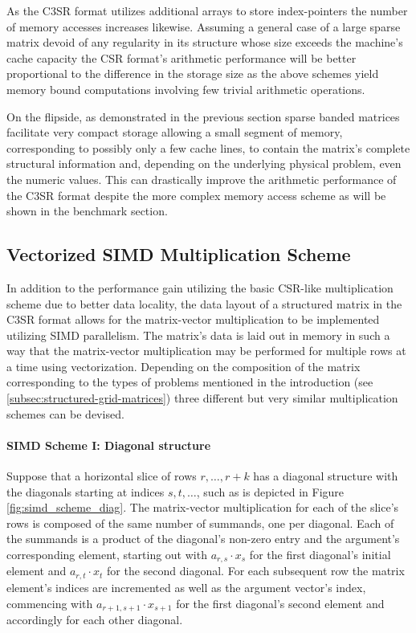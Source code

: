       As the C3SR format utilizes additional arrays to store index-pointers the number of memory accesses increases likewise. Assuming a general case of a large sparse matrix devoid of any regularity in its structure whose size exceeds the machine's cache capacity the CSR format's arithmetic performance will be better proportional to the difference in the storage size as the above schemes yield memory bound computations involving few trivial arithmetic operations.

      On the flipside, as demonstrated in the previous section sparse banded matrices facilitate very compact storage allowing a small segment of memory, corresponding to possibly only a few cache lines, to contain the matrix's complete structural information and, depending on the underlying physical problem, even the numeric values. This can drastically improve the arithmetic performance of the C3SR format despite the more complex memory access scheme as will be shown in the benchmark section.

    \subsection{Vectorized SIMD Multiplication Scheme} \label{subsubsec:vectorized-simd-multiplication-scheme}

      In addition to the performance gain utilizing the basic CSR-like multiplication scheme due to better data locality, the data layout of a structured matrix in the C3SR format allows for the matrix-vector multiplication to be implemented utilizing SIMD parallelism. The matrix's data is laid out in memory in such a way that the matrix-vector multiplication may be performed for multiple rows at a time using vectorization. Depending on the composition of the matrix corresponding to the types of problems mentioned in the introduction (see \ref{subsec:structured-grid-matrices}) three different but very similar multiplication schemes can be devised.

      \paragraph{SIMD Scheme I: Diagonal structure}

      Suppose that a horizontal slice of rows $r, \ldots, r+k$ has a diagonal structure with the diagonals starting at indices $s, t, \ldots $, such as is depicted in Figure \ref{fig:simd_scheme_diag}. The matrix-vector multiplication for each of the slice's rows is composed of the same number of summands, one per diagonal. Each of the summands is a product of the diagonal's non-zero entry and the argument's corresponding element, starting out with $a_{r,s} \cdot x_s$ for the first diagonal's initial element and $a_{r,t} \cdot x_t$ for the second diagonal. For each subsequent row the matrix element's indices are incremented as well as the argument vector's index, commencing with $a_{r+1, s+1} \cdot x_{s+1}$ for the first diagonal's second element and accordingly for each other diagonal.

